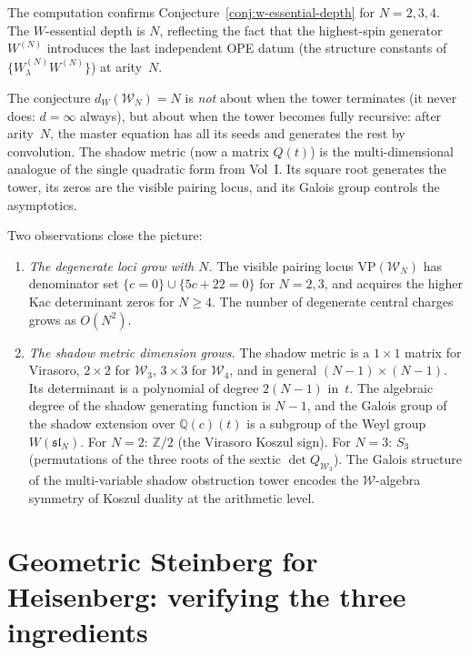 \documentclass[11pt]{article}
\newcommand{\cW}{\mathcal{W}}
\newcommand{\fsl}{\mathfrak{sl}}
\newcommand{\Z}{\mathbb{Z}}
\newcommand{\Q}{\mathbb{Q}}
\begin{document}
The computation confirms Conjecture~\ref{conj:w-essential-depth}
for $N = 2, 3, 4$.  The $W$-essential depth is $N$, reflecting
the fact that the highest-spin generator $W^{(N)}$ introduces
the last independent OPE datum (the structure constants of
$\{W^{(N)}_\lambda W^{(N)}\}$) at arity~$N$.

The conjecture $d_W(\cW_N) = N$ is \emph{not} about when the
tower terminates (it never does: $d = \infty$ always), but about
when the tower becomes fully recursive: after arity~$N$, the
master equation has all its seeds and generates the rest by
convolution.  The shadow metric (now a matrix $Q(t)$) is the
multi-dimensional analogue of the single quadratic form from
Vol~I.  Its square root generates the tower, its zeros are the
visible pairing locus, and its Galois group controls the
asymptotics.

Two observations close the picture:

\begin{enumerate}[label=(\alph*)]
\item \emph{The degenerate loci grow with $N$.}
  The visible pairing locus $\mathrm{VP}(\cW_N)$ has
  denominator set $\{c = 0\} \cup \{5c + 22 = 0\}$ for $N = 2, 3$,
  and acquires the higher Kac determinant zeros for $N \ge 4$.
  The number of degenerate central charges grows as $O(N^2)$.

\item \emph{The shadow metric dimension grows.}
  The shadow metric is a $1 \times 1$ matrix for Virasoro,
  $2 \times 2$ for $\cW_3$, $3 \times 3$ for $\cW_4$, and in
  general $(N{-}1) \times (N{-}1)$.  Its determinant is a
  polynomial of degree $2(N{-}1)$ in~$t$.  The algebraic
  degree of the shadow generating function is $N{-}1$, and
  the Galois group of the shadow extension over $\Q(c)(t)$
  is a subgroup of the Weyl group $W(\fsl_N)$.
  For $N = 2$: $\Z/2$ (the Virasoro Koszul sign).
  For $N = 3$: $S_3$ (permutations of the three roots of the
  sextic $\det Q_{\cW_3}$).
  The Galois structure of the multi-variable shadow obstruction tower encodes
  the $\cW$-algebra symmetry of Koszul duality at the arithmetic
  level.
\end{enumerate}


\section{Geometric Steinberg for Heisenberg: verifying the three ingredients}
\label{sec:geometric-steinberg-heisenberg}
\end{document}
